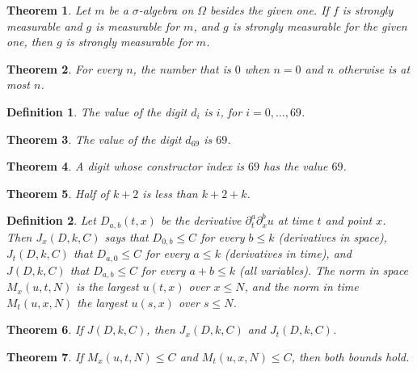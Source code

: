 \documentclass[11pt]{article}
\newtheorem{theorem}{Theorem}
\newtheorem{definition}{Definition}
\newcommand{\lean}[1]{}
\begin{document}
\begin{theorem}\label{thm:adapted}\lean{Shape.adapted}
Let $m$ be a $\sigma$-algebra on $\Omega$ besides the given one. If $f$ is strongly measurable and
$g$ is measurable for $m$, and $g$ is strongly measurable for the given one, then $g$ is strongly
measurable for $m$.
\end{theorem}

\begin{theorem}\label{thm:decided}\lean{Shape.decided}
For every $n$, the number that is $0$ when $n = 0$ and $n$ otherwise is at most $n$.
\end{theorem}

\begin{definition}\label{def:digit}\lean{Shape.Digit.val}
The value of the digit $d_i$ is $i$, for $i = 0, \dots, 69$.
\end{definition}

\begin{theorem}\label{thm:digit}\lean{Shape.last_digit}
The value of the digit $d_{69}$ is $69$.
\end{theorem}

\begin{theorem}\label{thm:digit-index}\lean{Shape.last_index}
A digit whose constructor index is $69$ has the value $69$.
\end{theorem}

\begin{theorem}\label{thm:margin}\lean{Shape.margin_half}
Half of $k + 2$ is less than $k + 2 + k$.
\end{theorem}

\begin{definition}\label{def:jets}\lean{Shape.SpaceJet}\lean{Shape.TimeJet}\lean{Shape.FullJet}\lean{Shape.supSpace}\lean{Shape.supTime}
Let $D_{a,b}(t, x)$ be the derivative $\partial_t^a \partial_x^b u$ at time $t$ and point $x$.
Then $J_x(D, k, C)$ says that $D_{0,b} \le C$ for every $b \le k$ (derivatives in space),
$J_t(D, k, C)$ that $D_{a,0} \le C$ for every $a \le k$ (derivatives in time), and
$J(D, k, C)$ that $D_{a,b} \le C$ for every $a + b \le k$ (all variables). The norm in space
$M_x(u, t, N)$ is the largest $u(t, x)$ over $x \le N$, and the norm in time $M_t(u, x, N)$ the
largest $u(s, x)$ over $s \le N$.
\end{definition}

\begin{theorem}\label{thm:jets}\lean{Shape.full_jet_split}
If $J(D, k, C)$, then $J_x(D, k, C)$ and $J_t(D, k, C)$.
\end{theorem}

\begin{theorem}\label{thm:norms}\lean{Shape.norm_bounds}
If $M_x(u, t, N) \le C$ and $M_t(u, x, N) \le C$, then both bounds hold.
\end{theorem}
\end{document}
